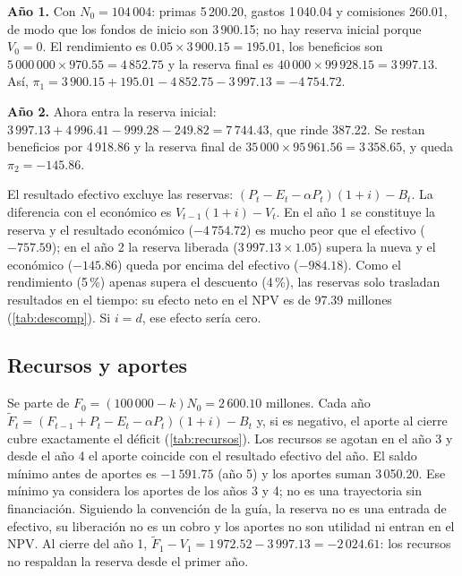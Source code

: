 \documentclass[10pt,a4paper]{article}
\numberwithin{equation}{section}
\newcommand{\tabla}[1]{}
\newcommand{\um}{u.m.}
\begin{document}
	\textbf{Año 1.} Con \(N_0=104\,004\): primas 5\,200.20, gastos 1\,040.04 y comisiones 260.01, de modo que los fondos de inicio son 3\,900.15; no hay reserva inicial porque \(V_0=0\). El rendimiento es \(0.05\times3\,900.15=195.01\), los beneficios son \(5\,000\,000\times970.55=4\,852.75\) y la reserva final es \(40\,000\times99\,928.15=3\,997.13\). Así, \(\pi_1=3\,900.15+195.01-4\,852.75-3\,997.13=-4\,754.72\).

	\textbf{Año 2.} Ahora entra la reserva inicial: \(3\,997.13+4\,996.41-999.28-249.82=7\,744.43\), que rinde 387.22. Se restan beneficios por 4\,918.86 y la reserva final de \(35\,000\times95\,961.56=3\,358.65\), y queda \(\pi_2=-145.86\).

	El resultado efectivo excluye las reservas: \((P_t-E_t-\alpha P_t)(1+i)-B_t\). La diferencia con el económico es \(V_{t-1}(1+i)-V_t\). En el año 1 se constituye la reserva y el resultado económico (\(-4\,754.72\)) es mucho peor que el efectivo (\(-757.59\)); en el año 2 la reserva liberada (\(3\,997.13\times1.05\)) supera la nueva y el económico (\(-145.86\)) queda por encima del efectivo (\(-984.18\)). Como el rendimiento (5\,\%) apenas supera el descuento (4\,\%), las reservas solo trasladan resultados en el tiempo: su efecto neto en el NPV es de 97.39 millones (\cref{tab:descomp}). Si \(i=d\), ese efecto sería cero.

	\begin{table}[htbp]
		\centering\small
		\setlength{\tabcolsep}{4pt}
		\tabla{C_flujos_base}
		\caption{Flujos, reservas y resultados del caso base, en millones de \um\ Resultado es el económico \eqref{eq:profit}; Efectivo excluye los movimientos de reserva.}\label{tab:flujos}
	\end{table}

	\subsection{Recursos y aportes}

	Se parte de \(F_0=(100\,000-k)N_0=2\,600.10\) millones. Cada año \(\widetilde F_t=(F_{t-1}+P_t-E_t-\alpha P_t)(1+i)-B_t\) y, si es negativo, el aporte al cierre cubre exactamente el déficit (\cref{tab:recursos}). Los recursos se agotan en el año 3 y desde el año 4 el aporte coincide con el resultado efectivo del año. El saldo mínimo antes de aportes es \(-1\,591.75\) (año 5) y los aportes suman 3\,050.20. Ese mínimo ya considera los aportes de los años 3 y 4; no es una trayectoria sin financiación. Siguiendo la convención de la guía, la reserva no es una entrada de efectivo, su liberación no es un cobro y los aportes no son utilidad ni entran en el NPV. Al cierre del año 1, \(\widetilde F_1-V_1=1\,972.52-3\,997.13=-2\,024.61\): los recursos no respaldan la reserva desde el primer año.
\end{document}
